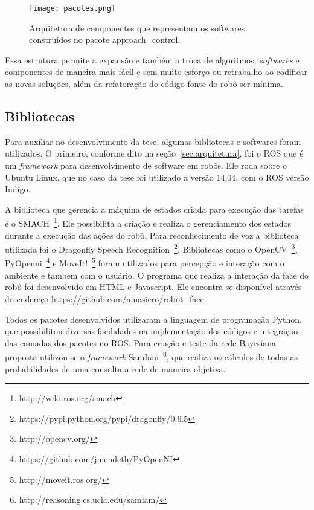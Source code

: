 \begin{figure}[ht!]
	\centering
	\begin{minipage}{0.9\textwidth}
		\caption{Arquitetura de componentes que representam os softwares construídos no pacote approach\_control.}
		\texttt{[image: pacotes.png]}
		\label{fig:pacotes}
	\end{minipage}
\end{figure}

Essa estrutura permite a expansão e também a troca de algoritmos, \textit{softwares} e componentes de maneira mais fácil e sem muito esforço ou retrabalho ao codificar as novas soluções, além da refatoração do código fonte do robô ser mínima.


\subsection{Bibliotecas}
\label{sec:bibliotecas}
Para auxiliar no desenvolvimento da tese, algumas bibliotecas e softwares foram utilizados. O primeiro, conforme dito na seção~\ref{sec:arquitetura}, foi o ROS que é um \emph{framework} para desenvolvimento de software em robôs. Ele roda sobre o Ubuntu Linux, que no caso da tese foi utilizado a versão 14.04, com o ROS versão Indigo.

A biblioteca que gerencia a máquina de estados criada para execução das tarefas é o SMACH~\footnote{http://wiki.ros.org/smach}. Ele possibilita a criação e realiza o gerenciamento dos estados durante a execução das ações do robô. Para reconhecimento de voz a biblioteca utilizada foi o Dragonfly Speech Recognition~\footnote{https://pypi.python.org/pypi/dragonfly/0.6.5}. Bibliotecas como o OpenCV~\footnote{http://opencv.org/}, PyOpenni~\footnote{https://github.com/jmendeth/PyOpenNI} e MoveIt!~\footnote{http://moveit.ros.org/} foram utilizados para percepção e interação com o ambiente e também com o usuário. O programa que realiza a interação da face do robô foi desenvolvido em HTML e Javascript. Ele encontra-se disponível através do endereço \url{https://github.com/amasiero/robot\_face}.

Todos os pacotes desenvolvidos utilizaram a linguagem de programação Python, que possibilitou diversas facilidades na implementação dos códigos e integração das camadas dos pacotes no ROS. Para criação e teste da rede Bayesiana proposta utilizou-se o \emph{framework} SamIam~\footnote{http://reasoning.cs.ucla.edu/samiam/}, que realiza os cálculos de todas as probabilidades de uma consulta a rede de maneira objetiva.


